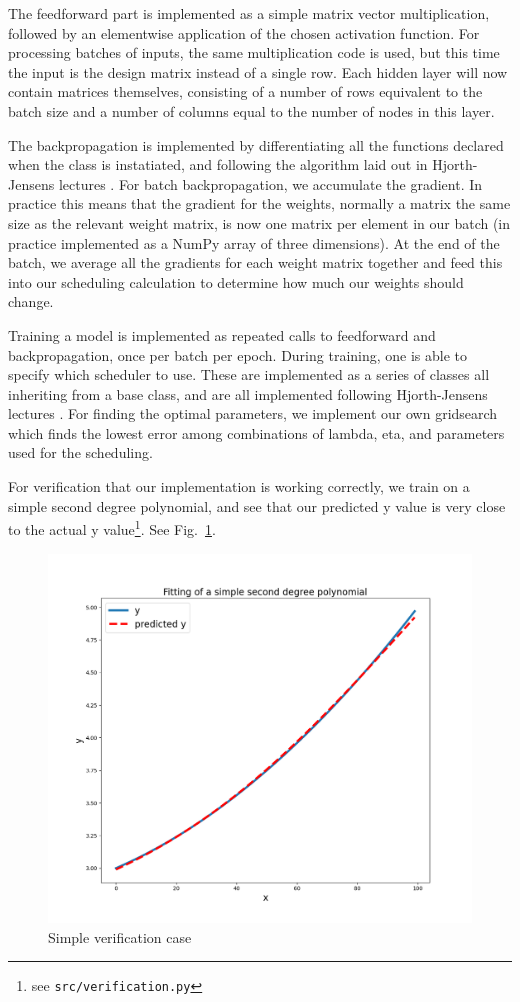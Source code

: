 \documentclass[onecolumn,10pt,cleanfoot]{asme2ej}
\begin{document}
The feedforward part is implemented as a simple matrix vector multiplication, followed by an elementwise application of the chosen activation function. For processing batches of inputs, the same multiplication code is used, but this time the input is the design matrix instead of a single row. Each hidden layer will now contain matrices themselves, consisting of a number of rows equivalent to the batch size and a number of columns equal to the number of nodes in this layer.

The backpropagation is implemented by differentiating all the functions declared when the class is instatiated, and following the algorithm laid out in Hjorth-Jensens lectures \cite{morten}. For batch backpropagation, we accumulate the gradient. In practice this means that the gradient for the weights, normally a matrix the same size as the relevant weight matrix, is now one matrix per element in our batch (in practice implemented as a NumPy array of three dimensions). At the end of the batch, we average all the gradients for each weight matrix together and feed this into our scheduling calculation to determine how much our weights should change.

Training a model is implemented as repeated calls to feedforward and backpropagation, once per batch per epoch. During training, one is able to specify which scheduler to use. These are implemented as a series of classes all inheriting from a base class, and are all implemented following Hjorth-Jensens lectures \cite{mortensched}. For finding the optimal parameters, we implement our own gridsearch which finds the lowest error among combinations of lambda, eta, and parameters used for the scheduling.

For verification that our implementation is working correctly, we train on a simple second degree polynomial, and see that our predicted y value is very close to the actual y value\footnote{see \texttt{src/verification.py}}. See Fig.~\ref{verification}.

\begin{figure}[h]
\centerline{\includegraphics[width=5in]{figure/verification.png}}
\caption{Simple verification case}
\label{verification}
\end{figure}
\end{document}
